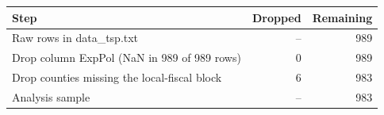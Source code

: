 \begin{tabular}{lrr}
\toprule
Step & Dropped & Remaining \\
\midrule
Raw rows in data\_tsp.txt & -- & 989 \\
Drop column ExpPol (NaN in 989 of 989 rows) & 0 & 989 \\
Drop counties missing the local-fiscal block & 6 & 983 \\
Analysis sample & -- & 983 \\
\bottomrule
\end{tabular}
